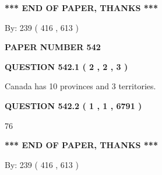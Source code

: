 \documentclass[12pt]{article}
\begin{document}
   
   
\vspace{1.0in} 
{\textbf{\large{ *** END OF PAPER, THANKS *** }}} 
   
   
\hspace{1.0in} By: 
 239 ( 416 ,  613 )
   
   
   
   
\newpage 
\setcounter{page}{ 
   542001 } 
   
   
   
   
 {\textbf{ \Large{ PAPER NUMBER  542  }}}
   
   
\vspace{0.2in}
   
   
   
   
   
   
 \vspace{0.2in}
 
 
 
 
   
   
  
\vspace{0.2in}
  
{\textbf{\Large{QUESTION
542.1 
 ( 2 , 2 , 3 )
}}}
  
  
 
 
\noindent{}
 
 
Canada has 10  provinces and 3 territories.
 
 
 
 
  
\vspace{0.2in}
  
{\textbf{\Large{QUESTION
542.2 
 ( 1 , 1 , 6791 )
}}}
  
  
 
 
\noindent{}

76
 
 
   
   
 \vspace{0.2in}
 
   
   
   
   
\vspace{1.0in} 
{\textbf{\large{ *** END OF PAPER, THANKS *** }}} 
   
   
\hspace{1.0in} By: 
 239 ( 416 ,  613 )
   
\end{document}
